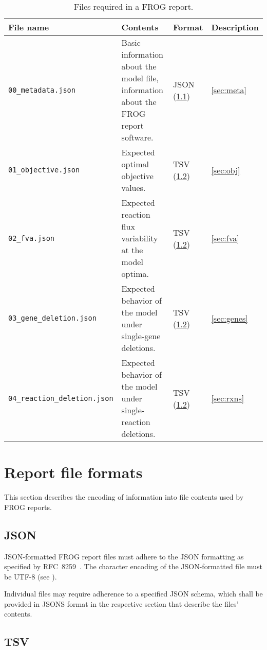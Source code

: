 \begin{table}[p]\tablefont
\begin{tabular}{lp{.3\linewidth}ll}
\toprule
File name & Contents & Format & Description \\
\midrule
\texttt{00\_metadata.json}
 & Basic information about the model file, information about the FROG report software.
 & JSON (\cref{sec:json})
 & \cref{sec:meta}
 \\\addlinespace
\texttt{01\_objective.json}
 & Expected optimal objective values.
 & TSV (\cref{sec:tsv})
 & \cref{sec:obj}
 \\\addlinespace
\texttt{02\_fva.json}
 & Expected reaction flux variability at the model optima.
 & TSV (\cref{sec:tsv})
 & \cref{sec:fva}
 \\\addlinespace
\texttt{03\_gene\_deletion.json}
 & Expected behavior of the model under single-gene deletions.
 & TSV (\cref{sec:tsv})
 & \cref{sec:genes}
 \\\addlinespace
\texttt{04\_reaction\_deletion.json}
 & Expected behavior of the model under single-reaction deletions.
 & TSV (\cref{sec:tsv})
 & \cref{sec:rxns} \\
\bottomrule
\end{tabular}
\caption{Files required in a FROG report.}
\label{tab:files}
\end{table}

\section{Report file formats}

This section describes the encoding of information into file contents used by FROG reports.

\subsection{JSON}
\label{sec:json}

JSON-formatted FROG report files must adhere to the JSON formatting as specified by RFC~8259~\cite{rfc8259}.
The character encoding of the JSON-formatted file must be UTF-8 (see \cite[][section 8.1]{rfc8259}).

Individual files may require adherence to a specified JSON schema, which shall be provided in JSONS format in the respective section that describe the files' contents.

\subsection{TSV}
\label{sec:tsv}

